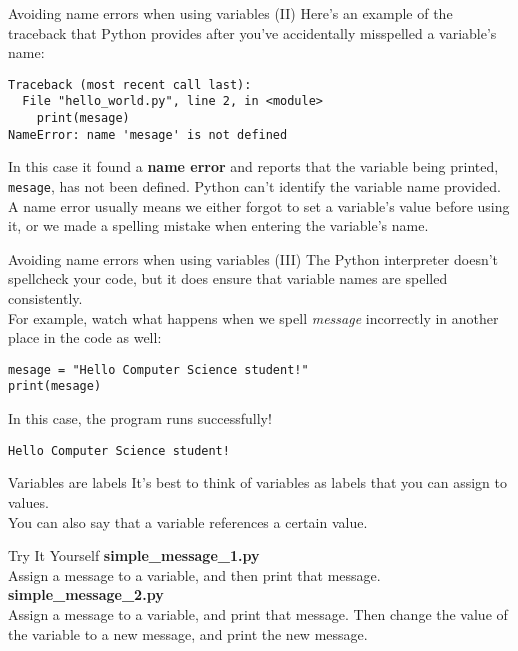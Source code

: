\documentclass[aspectratio=169]{beamer}
\begin{document}
\begin{frame}[fragile]{Avoiding name errors when using variables (II)}
    Here's an example of the traceback that Python provides after you've accidentally misspelled a variable's name:
    \vspace{10pt}
    \begin{Verbatim}
Traceback (most recent call last):
  File "hello_world.py", line 2, in <module>
    print(mesage)
NameError: name 'mesage' is not defined
    \end{Verbatim}
    \vspace{10pt}
    In this case it found a \textbf{name error} and reports that the variable being printed, \texttt{mesage}, has not been defined.
    Python can't identify the variable name provided. \\
    \vspace{10pt}
    A name error usually means we either forgot to set a variable's value before using it, or we made a spelling mistake when entering the variable's name.
\end{frame}


\begin{frame}[fragile]{Avoiding name errors when using variables (III)}
    The Python interpreter doesn't spellcheck your code, but it does ensure that variable names are spelled consistently. \\
    \vspace{10pt}
    For example, watch what happens when we spell \textit{message} incorrectly in another place in the code as well:
    \begin{Verbatim}
mesage = "Hello Computer Science student!"
print(mesage)
    \end{Verbatim}
    \vspace{10pt}
    In this case, the program runs successfully!
    \vspace{10pt}
    \begin{Verbatim}
Hello Computer Science student!
    \end{Verbatim}
\end{frame}


\begin{frame}{Variables are labels}
    It's best to think of variables as labels that you can assign to values. \\
    \vspace{15pt}
    You can also say that a variable references a certain value.
\end{frame}


\begin{frame}{Try It Yourself}
    \textbf{simple\_message\_1.py} \\
    Assign a message to a variable, and then print that message. \\
    \vspace{15pt}
    \textbf{simple\_message\_2.py} \\
    Assign a message to a variable, and print that message.
    Then change the value of the variable to a new message, and print the new message.
\end{frame}
\end{document}
